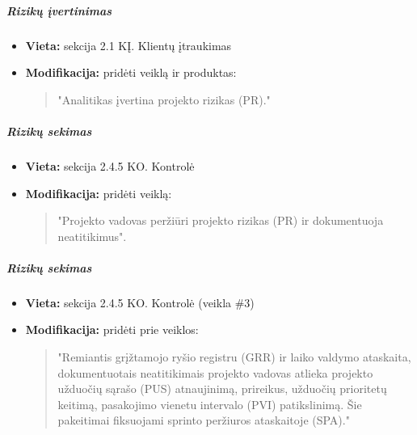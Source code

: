 \documentclass{article}
\begin{document}
\subparagraph{Rizikų įvertinimas}
\begin{itemize}
    \item \textbf{Vieta:} sekcija 2.1 KĮ. Klientų įtraukimas
    \item \textbf{Modifikacija:} pridėti veiklą ir produktas:
    \begin{quote}
        "Analitikas įvertina projekto rizikas (PR)."
    \end{quote}
\end{itemize}

\subparagraph{Rizikų sekimas}
\begin{itemize}
    \item \textbf{Vieta:} sekcija 2.4.5 KO. Kontrolė
    \item \textbf{Modifikacija:} pridėti veiklą:
    \begin{quote}
        "Projekto vadovas peržiūri projekto rizikas (PR) ir dokumentuoja neatitikimus".
    \end{quote}
\end{itemize}

\subparagraph{Rizikų sekimas}
\begin{itemize}
    \item \textbf{Vieta:} sekcija 2.4.5 KO. Kontrolė (veikla \#3)
    \item \textbf{Modifikacija:} pridėti prie veiklos:
    \begin{quote}
        "Remiantis grįžtamojo ryšio registru (GRR) ir laiko valdymo ataskaita, dokumentuotais neatitikimais projekto vadovas atlieka projekto užduočių sąrašo (PUS) atnaujinimą, prireikus, užduočių prioritetų keitimą, pasakojimo vienetu intervalo (PVI) patikslinimą. Šie pakeitimai fiksuojami sprinto peržiuros ataskaitoje (SPA)."
    \end{quote}
\end{itemize}
\end{document}
